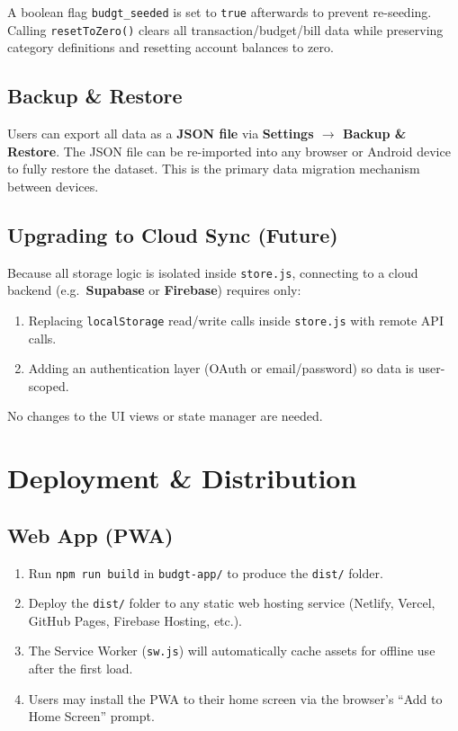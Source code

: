 \documentclass[12pt, a4paper]{article}
\begin{document}
A boolean flag \texttt{budgt\_seeded} is set to \texttt{true} afterwards to prevent re-seeding. Calling \texttt{resetToZero()} clears all transaction/budget/bill data while preserving category definitions and resetting account balances to zero.

\subsection{Backup \& Restore}

Users can export all data as a \textbf{JSON file} via \textbf{Settings $\rightarrow$ Backup \& Restore}. The JSON file can be re-imported into any browser or Android device to fully restore the dataset. This is the primary data migration mechanism between devices.

\subsection{Upgrading to Cloud Sync (Future)}

Because all storage logic is isolated inside \texttt{store.js}, connecting to a cloud backend (e.g.\ \textbf{Supabase} or \textbf{Firebase}) requires only:
\begin{enumerate}[leftmargin=1.5em]
  \item Replacing \texttt{localStorage} read/write calls inside \texttt{store.js} with remote API calls.
  \item Adding an authentication layer (OAuth or email/password) so data is user-scoped.
\end{enumerate}
No changes to the UI views or state manager are needed.

\section{Deployment \& Distribution}

\subsection{Web App (PWA)}

\begin{enumerate}[leftmargin=1.5em]
  \item Run \texttt{npm run build} in \texttt{budgt-app/} to produce the \texttt{dist/} folder.
  \item Deploy the \texttt{dist/} folder to any static web hosting service (Netlify, Vercel, GitHub Pages, Firebase Hosting, etc.).
  \item The Service Worker (\texttt{sw.js}) will automatically cache assets for offline use after the first load.
  \item Users may install the PWA to their home screen via the browser's ``Add to Home Screen'' prompt.
\end{enumerate}
\end{document}

